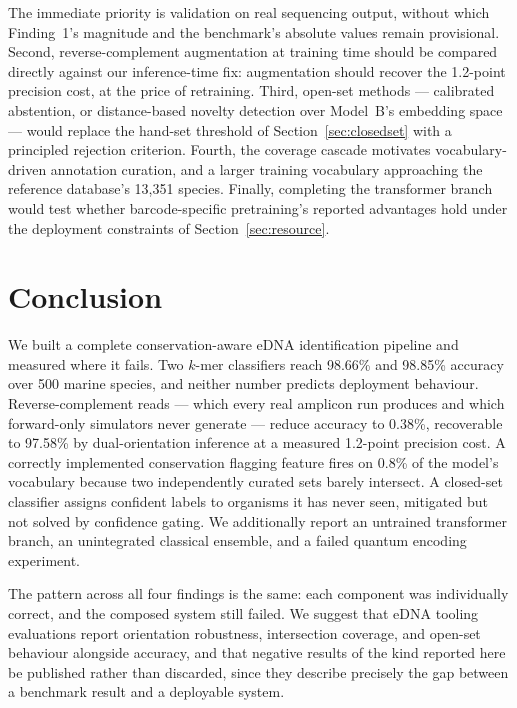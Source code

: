 \documentclass[conference]{IEEEtran}
\begin{document}
The immediate priority is validation on real sequencing output, without
which Finding~1's magnitude and the benchmark's absolute values remain
provisional. Second, reverse-complement augmentation at training time should
be compared directly against our inference-time fix: augmentation should
recover the 1.2-point precision cost, at the price of retraining.
Third, open-set methods --- calibrated abstention, or distance-based
novelty detection over Model~B's embedding space --- would replace the
hand-set threshold of Section~\ref{sec:closedset} with a principled
rejection criterion. Fourth, the coverage cascade motivates
vocabulary-driven annotation curation, and a larger training vocabulary
approaching the reference database's 13{,}351 species. Finally, completing
the transformer branch would test whether barcode-specific pretraining's
reported advantages hold under the deployment constraints of
Section~\ref{sec:resource}.

\section{Conclusion}

We built a complete conservation-aware eDNA identification pipeline and
measured where it fails. Two $k$-mer classifiers reach 98.66\% and 98.85\%
accuracy over 500 marine species, and neither number predicts deployment
behaviour. Reverse-complement reads --- which every real amplicon run
produces and which forward-only simulators never generate --- reduce
accuracy to 0.38\%, recoverable to 97.58\% by dual-orientation inference at
a measured 1.2-point precision cost. A correctly implemented conservation
flagging feature fires on 0.8\% of the model's vocabulary because two
independently curated sets barely intersect. A closed-set classifier assigns
confident labels to organisms it has never seen, mitigated but not solved by
confidence gating. We additionally report an untrained transformer branch,
an unintegrated classical ensemble, and a failed quantum encoding
experiment.

The pattern across all four findings is the same: each component was
individually correct, and the composed system still failed. We suggest that
eDNA tooling evaluations report orientation robustness, intersection
coverage, and open-set behaviour alongside accuracy, and that negative
results of the kind reported here be published rather than discarded, since
they describe precisely the gap between a benchmark result and a deployable
system.
\end{document}
